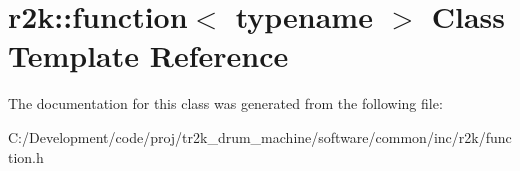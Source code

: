 \hypertarget{classr2k_1_1function}{}\section{r2k\+::function$<$ typename $>$ Class Template Reference}
\label{classr2k_1_1function}


The documentation for this class was generated from the following file\+:\begin{DoxyCompactItemize}
\item 
C\+:/\+Development/code/proj/tr2k\+\_\+drum\+\_\+machine/software/common/inc/r2k/function.\+h\end{DoxyCompactItemize}
